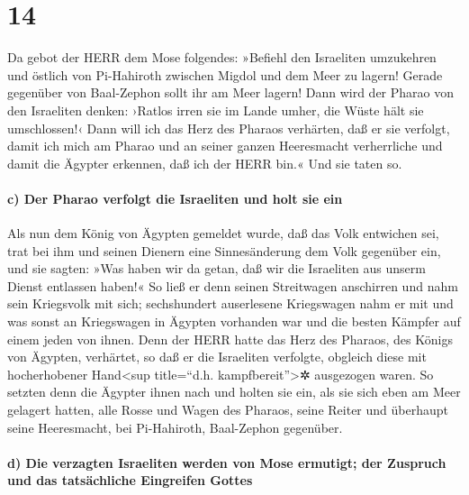 \hypertarget{section-13}{%
\section{14}\label{section-13}}

 Da gebot der HERR dem Mose folgendes: 
»Befiehl den Israeliten umzukehren und östlich von Pi-Hahiroth zwischen
Migdol und dem Meer zu lagern! Gerade gegenüber von Baal-Zephon sollt
ihr am Meer lagern!  Dann wird der Pharao von den
Israeliten denken: ›Ratlos irren sie im Lande umher, die Wüste hält sie
umschlossen!‹  Dann will ich das Herz des Pharaos
verhärten, daß er sie verfolgt, damit ich mich am Pharao und an seiner
ganzen Heeresmacht verherrliche und damit die Ägypter erkennen, daß ich
der HERR bin.« Und sie taten so.

\hypertarget{c-der-pharao-verfolgt-die-israeliten-und-holt-sie-ein}{%
\paragraph{c) Der Pharao verfolgt die Israeliten und holt sie
ein}\label{c-der-pharao-verfolgt-die-israeliten-und-holt-sie-ein}}

 Als nun dem König von Ägypten gemeldet wurde, daß das
Volk entwichen sei, trat bei ihm und seinen Dienern eine Sinnesänderung
dem Volk gegenüber ein, und sie sagten: »Was haben wir da getan, daß wir
die Israeliten aus unserm Dienst entlassen haben!«  So
ließ er denn seinen Streitwagen anschirren und nahm sein Kriegsvolk mit
sich;  sechshundert auserlesene Kriegswagen nahm er mit
und was sonst an Kriegswagen in Ägypten vorhanden war und die besten
Kämpfer auf einem jeden von ihnen.  Denn der HERR hatte
das Herz des Pharaos, des Königs von Ägypten, verhärtet, so daß er die
Israeliten verfolgte, obgleich diese mit hocherhobener Hand\textless sup
title=``d.h. kampfbereit''\textgreater✲ ausgezogen waren. 
So setzten denn die Ägypter ihnen nach und holten sie ein, als sie sich
eben am Meer gelagert hatten, alle Rosse und Wagen des Pharaos, seine
Reiter und überhaupt seine Heeresmacht, bei Pi-Hahiroth, Baal-Zephon
gegenüber.

\hypertarget{d-die-verzagten-israeliten-werden-von-mose-ermutigt-der-zuspruch-und-das-tatsuxe4chliche-eingreifen-gottes}{%
\paragraph{d) Die verzagten Israeliten werden von Mose ermutigt; der
Zuspruch und das tatsächliche Eingreifen
Gottes}\label{d-die-verzagten-israeliten-werden-von-mose-ermutigt-der-zuspruch-und-das-tatsuxe4chliche-eingreifen-gottes}}

